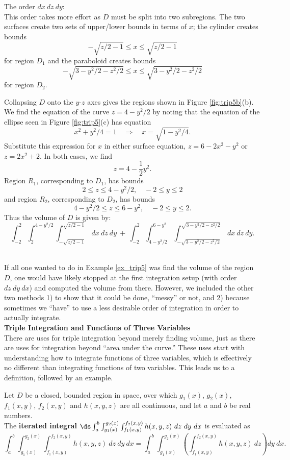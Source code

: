 {\noindent The order $dx\ dz\ dy$:\\

This order takes more effort as $D$ must be split into two subregions. The two surfaces create two sets of upper/lower bounds in terms of $x$; the cylinder creates bounds $$-\sqrt{z/2-1}\leq x\leq \sqrt{z/2-1}$$ for region $D_1$  and the paraboloid creates bounds $$-\sqrt{3-y^2/2-z^2/2}\leq x\leq \sqrt{3-y^2/2-z^2/2}$$ for region $D_2$.


Collapsing $D$ onto the $y$-$z$ axes gives the regions shown in Figure \ref{fig:trip5b}(b). We find the equation of the curve $z=4-y^2/2$ by noting that the equation of the ellipse seen in Figure \ref{fig:trip5}(c) has equation 
$$x^2+y^2/4=1 \quad \Rightarrow \quad x = \sqrt{1-y^2/4}.$$  
Substitute this expression for $x$ in either surface equation, $z=6-2x^2-y^2$ or $z=2x^2+2$. In both cases, we find $$z=4-\frac12y^2.$$
\drawexampleline
Region $R_1$, corresponding to $D_1$, has bounds $$2\leq z\leq 4-y^2/2,\quad -2\leq y\leq 2$$ and region $R_2$, corresponding to $D_2$, has bounds $$4-y^2/2\leq z\leq 6-y^2,\quad -2\leq y\leq 2.$$ Thus the volume of $D$ is given by:
$$\int_{-2}^2\int_2^{4-y^2/2}\int_{-\sqrt{z/2-1}}^{\sqrt{z/2-1}}\ dx\ dz\ dy \ +\ \int_{-2}^2\int_{4-y^2/2}^{6-y^2}\int_{-\sqrt{3-y^2/2-z^2/2}}^{\sqrt{3-y^2/2-z^2/2}}\ dx\ dz\ dy.$$

}\\

If all one wanted to do in Example \ref{ex_trip5} was find the volume of the region $D$, one would have likely stopped at the first integration setup (with order $dz\ dy\ dx$) and computed the volume from there. However, we included the other two methods 1) to show that it could be done, ``messy'' or not, and 2) because sometimes we ``have'' to use a less desirable order of integration in order to actually integrate.\\

\noindent\textbf{\Large Triple Integration and Functions of Three Variables} \\

There are uses for triple integration beyond merely finding volume, just as there are uses for integration beyond ``area under the curve.'' These uses start with understanding how to integrate functions of three variables, which is effectively no different than integrating functions of two variables. This leads us to a definition, followed by an example.

{Let $D$ be a closed, bounded region in space, over which $g_1(x)$, $g_2(x)$, $f_1(x,y)$, $f_2(x,y)$ and $h(x,y,z)$ are all continuous, and let $a$ and $b$ be real numbers.\\

The \textbf{iterated integral} $\ds \int_a^b\int_{g_1(x)}^{g_2(x)}\int_{f_1(x,y)}^{f_2(x,y)} h(x,y,z)\ dz\ dy\ dx$ is evaluated as
\small
$$\int_a^b\int_{g_1(x)}^{g_2(x)}\int_{f_1(x,y)}^{f_2(x,y)} h(x,y,z)\ dz\ dy\ dx = \int_a^b\int_{g_1(x)}^{g_2(x)}\left(\int_{f_1(x,y)}^{f_2(x,y)} h(x,y,z)\ dz\right) dy\ dx.$$\normalsize
}


